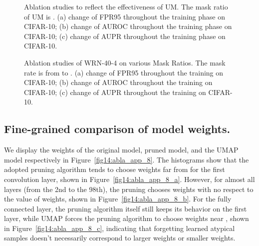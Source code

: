 \documentclass{article}
\theoremstyle{plain}
\theoremstyle{definition}
\theoremstyle{remark}
\begin{document}
\begin{figure}[t!]
    \begin{center}
    \end{center}
    \caption{Ablation studies to reflect the effectiveness of UM. The mask ratio of UM is . (a) change of FPR95 throughout the training phase on CIFAR-10; (b) change of AUROC throughout the training phase  on CIFAR-10; (c) change of AUPR throughout the training phase on CIFAR-10.}
    \label{fig12:abla_app_6}
\end{figure}

\begin{figure}[t!]
    \begin{center}
    \end{center}
    \caption{Ablation studies of WRN-40-4 on various Mask Ratios. The mask rate is from  to . (a) change of FPR95 throughout the training on CIFAR-10; (b) change of AUROC throughout the training on CIFAR-10; (c) change of AUPR throughout the training on CIFAR-10.}
    \label{fig13:abla_app_7}
\end{figure}


\subsection{Fine-grained comparison of model weights.}
\label{app:comp_prune_umap}

We display the weights of the original model, pruned model, and the UMAP model respectively in Figure~\ref{fig14:abla_app_8}. The histograms show that the adopted pruning algorithm tends to choose weights far from  for the first convolution layer, shown in Figure~\ref{fig14:abla_app_8_a}. However, for almost all layers (from the 2nd to the 98th), the pruning chooses weights with no respect to the value of weights, shown in Figure~\ref{fig14:abla_app_8_b}. For the fully connected layer, the pruning algorithm itself still keeps its behavior on the first layer, while UMAP forces the pruning algorithm to choose weights near , shown in Figure~\ref{fig14:abla_app_8_c}, indicating that forgetting learned atypical samples doesn't necessarily correspond to larger weights or smaller weights.
\end{document}
